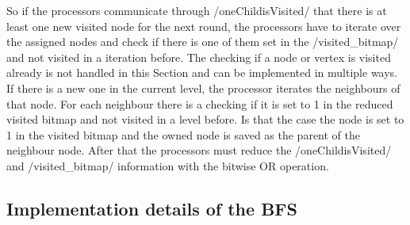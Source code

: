 \documentclass[12pt,a4paper]{article}
\begin{document}
So if the processors communicate through \cinline/oneChildisVisited/ that there is at least one new visited node for the next round, the processors have to iterate over the assigned nodes and check if there is one of them set in the \cinline/visited_bitmap/ and not visited in a iteration before. The checking if a node or vertex is visited already is not handled in this Section and can be implemented in multiple ways.
     If there is a new one in the current level, the processor iterates the neighbours of that node. For each neighbour there is a checking if it is set to 1 in the reduced visited bitmap and not visited in a level before. Is that the case the node is set to 1 in the visited bitmap and the owned node is saved as the parent of the neighbour node. After that the processors must reduce the \cinline/oneChildisVisited/ and \cinline/visited_bitmap/ information with the bitwise OR operation.

\subsection{Implementation details of the BFS}
\label{sec:impl_details}
\end{document}
